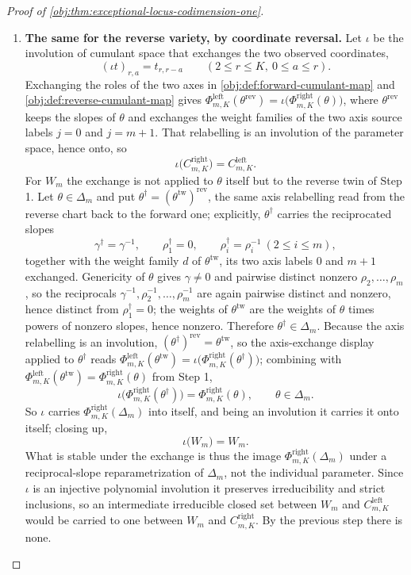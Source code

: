 \begin{proof}[Proof of \cref{obj:thm:exceptional-locus-codimension-one}]
\begin{enumerate}
\item \textbf{The same for the reverse variety, by coordinate reversal.}  Let \(\iota\) be the involution of cumulant space that exchanges the two observed coordinates,
\[
(\iota t)_{r,a}=t_{r,r-a}
\qquad (2\le r\le K,\ 0\le a\le r).
\]
Exchanging the roles of the two axes in \cref{obj:def:forward-cumulant-map} and \cref{obj:def:reverse-cumulant-map} gives \(\Phi^{\mathrm{left}}_{m,K}(\theta^{\mathrm{rev}})=\iota\bigl(\Phi^{\mathrm{right}}_{m,K}(\theta)\bigr)\), where \(\theta^{\mathrm{rev}}\) keeps the slopes of \(\theta\) and exchanges the weight families of the two axis source labels \(j=0\) and \(j=m+1\).  That relabelling is an involution of the parameter space, hence onto, so
\[
\iota\bigl(C^{\mathrm{right}}_{m,K}\bigr)=C^{\mathrm{left}}_{m,K}.
\]
For \(W_m\) the exchange is not applied to \(\theta\) itself but to the reverse twin of Step 1.  Let \(\theta\in\Delta_m\) and put \(\theta^{\dagger}=(\theta^{\mathrm{tw}})^{\mathrm{rev}}\), the same axis relabelling read from the reverse chart back to the forward one; explicitly, \(\theta^{\dagger}\) carries the reciprocated slopes
\[
\gamma^{\dagger}=\gamma^{-1},
\qquad
\rho^{\dagger}_1=0,
\qquad
\rho^{\dagger}_i=\rho_i^{-1}\ (2\le i\le m),
\]
together with the weight family \(d\) of \(\theta^{\mathrm{tw}}\), its two axis labels \(0\) and \(m+1\) exchanged.  Genericity of \(\theta\) gives \(\gamma\ne0\) and pairwise distinct nonzero \(\rho_2,\ldots,\rho_m\), so the reciprocals \(\gamma^{-1},\rho_2^{-1},\ldots,\rho_m^{-1}\) are again pairwise distinct and nonzero, hence distinct from \(\rho^{\dagger}_1=0\); the weights of \(\theta^{\mathrm{tw}}\) are the weights of \(\theta\) times powers of nonzero slopes, hence nonzero.  Therefore \(\theta^{\dagger}\in\Delta_m\).  Because the axis relabelling is an involution, \((\theta^{\dagger})^{\mathrm{rev}}=\theta^{\mathrm{tw}}\), so the axis-exchange display applied to \(\theta^{\dagger}\) reads \(\Phi^{\mathrm{left}}_{m,K}(\theta^{\mathrm{tw}})=\iota\bigl(\Phi^{\mathrm{right}}_{m,K}(\theta^{\dagger})\bigr)\); combining with \(\Phi^{\mathrm{left}}_{m,K}(\theta^{\mathrm{tw}})=\Phi^{\mathrm{right}}_{m,K}(\theta)\) from Step 1,
\[
\iota\bigl(\Phi^{\mathrm{right}}_{m,K}(\theta^{\dagger})\bigr)=\Phi^{\mathrm{right}}_{m,K}(\theta),
\qquad\theta\in\Delta_m .
\]
So \(\iota\) carries \(\Phi^{\mathrm{right}}_{m,K}(\Delta_m)\) into itself, and being an involution it carries it onto itself; closing up,
\[
\iota\bigl(W_m\bigr)=W_m .
\]
What is stable under the exchange is thus the image \(\Phi^{\mathrm{right}}_{m,K}(\Delta_m)\) under a reciprocal-slope reparametrization of \(\Delta_m\), not the individual parameter.  Since \(\iota\) is an injective polynomial involution it preserves irreducibility and strict inclusions, so an intermediate irreducible closed set between \(W_m\) and \(C^{\mathrm{left}}_{m,K}\) would be carried to one between \(W_m\) and \(C^{\mathrm{right}}_{m,K}\).  By the previous step there is none.

\end{enumerate}
\end{proof}
